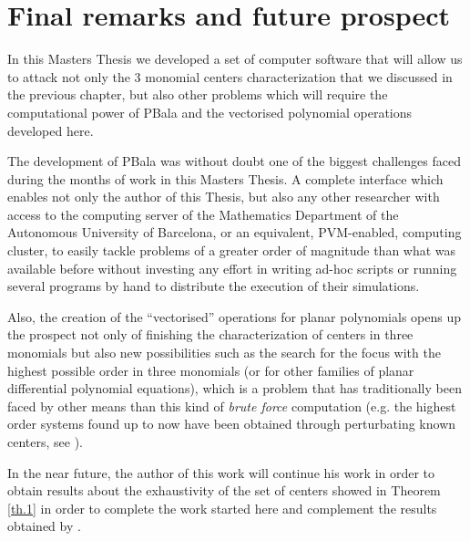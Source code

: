 
\chapter{Final remarks and future prospect}

In this Masters Thesis we developed a set of computer software that will allow us to attack not only the 3 monomial centers characterization that we discussed in the previous chapter, but also other problems which will require the computational power of PBala and the vectorised polynomial operations developed here.

The development of PBala was without doubt one of the biggest challenges faced during the months of work in this Masters Thesis. A complete interface which enables not only the author of this Thesis, but also any other researcher with access to the computing server of the Mathematics Department of the Autonomous University of Barcelona, or an equivalent, PVM-enabled, computing cluster, to easily tackle problems of a greater order of magnitude than what was available before without investing any effort in writing ad-hoc scripts or running several programs by hand to distribute the execution of their simulations.

Also, the creation of the ``vectorised'' operations for planar polynomials opens up the prospect not only of finishing the characterization of centers in three monomials but also new possibilities such as the search for the focus with the highest possible order in three monomials (or for other families of planar differential polynomial equations), which is a problem that has traditionally been faced by other means than this kind of \emph{brute force} computation (e.g. the highest order systems found up to now have been obtained through perturbating known centers, see ).

In the near future, the author of this work will continue his work in order to obtain results about the exhaustivity of the set of centers showed in Theorem \ref{th.1} in order to complete the work started here and complement the results obtained by \textcite{Gasull2016}.

